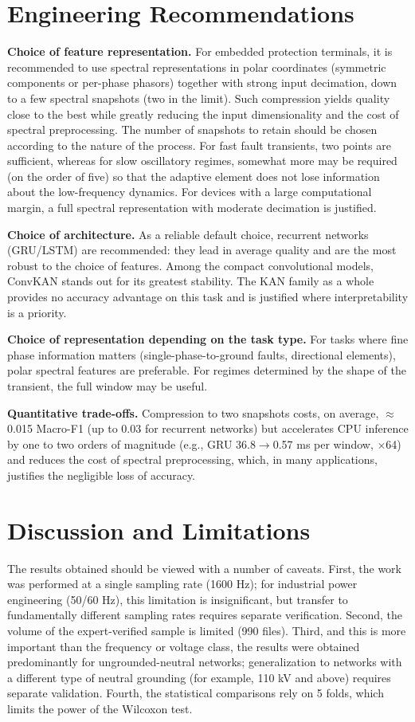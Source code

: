 \documentclass{ieeeojies}
\begin{document}
\section{Engineering Recommendations}

\textbf{Choice of feature representation.}
For embedded protection terminals, it is recommended to use spectral representations in polar coordinates (symmetric components or per-phase phasors) together with strong input decimation, down to a few spectral snapshots (two in the limit). Such compression yields quality close to the best while greatly reducing the input dimensionality and the cost of spectral preprocessing. The number of snapshots to retain should be chosen according to the nature of the process. For fast fault transients, two points are sufficient, whereas for slow oscillatory regimes, somewhat more may be required (on the order of five) so that the adaptive element does not lose information about the low-frequency dynamics. For devices with a large computational margin, a full spectral representation with moderate decimation is justified.

\textbf{Choice of architecture.}
As a reliable default choice, recurrent networks (GRU/LSTM) are recommended: they lead in average quality and are the most robust to the choice of features. Among the compact convolutional models, ConvKAN stands out for its greatest stability. The KAN family as a whole provides no accuracy advantage on this task and is justified where interpretability is a priority.

\textbf{Choice of representation depending on the task type.}
For tasks where fine phase information matters (single-phase-to-ground faults, directional elements), polar spectral features are preferable. For regimes determined by the shape of the transient, the full window may be useful. 

\textbf{Quantitative trade-offs.}
Compression to two snapshots costs, on average, $\approx$ 0.015 Macro-F1 (up to 0.03 for recurrent networks) but accelerates CPU inference by one to two orders of magnitude (e.g., GRU 36.8$\to$0.57 ms per window, $\times$64) and reduces the cost of spectral preprocessing, which, in many applications, justifies the negligible loss of accuracy.

\section{Discussion and Limitations}
The results obtained should be viewed with a number of caveats. First, the work was performed at a single sampling rate (1600 Hz); for industrial power engineering (50/60 Hz), this limitation is insignificant, but transfer to fundamentally different sampling rates requires separate verification. Second, the volume of the expert-verified sample is limited (990 files). Third, and this is more important than the frequency or voltage class, the results were obtained predominantly for ungrounded-neutral networks; generalization to networks with a different type of neutral grounding (for example, 110 kV and above) requires separate validation. Fourth, the statistical comparisons rely on 5 folds, which limits the power of the Wilcoxon test.
\end{document}
